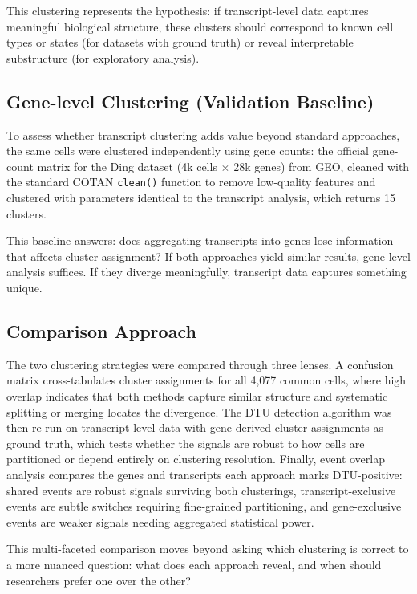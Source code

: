 This clustering represents the hypothesis: if transcript-level data captures meaningful biological structure, these clusters should correspond to known cell types or states (for datasets with ground truth) or reveal interpretable substructure (for exploratory analysis).

\subsection*{Gene-level Clustering (Validation Baseline)}

To assess whether transcript clustering adds value beyond standard approaches, the same cells were clustered independently using gene counts: the official gene-count matrix for the Ding dataset (4k cells $\times$ 28k genes) from GEO, cleaned with the standard COTAN \texttt{clean()} function to remove low-quality features and clustered with parameters identical to the transcript analysis, which returns 15 clusters.

This baseline answers: does aggregating transcripts into genes lose information that affects cluster assignment? If both approaches yield similar results, gene-level analysis suffices. If they diverge meaningfully, transcript data captures something unique.

\subsection*{Comparison Approach}

The two clustering strategies were compared through three lenses. A confusion matrix cross-tabulates cluster assignments for all 4,077 common cells, where high overlap indicates that both methods capture similar structure and systematic splitting or merging locates the divergence. The DTU detection algorithm was then re-run on transcript-level data with gene-derived cluster assignments as ground truth, which tests whether the signals are robust to how cells are partitioned or depend entirely on clustering resolution. Finally, event overlap analysis compares the genes and transcripts each approach marks DTU-positive: shared events are robust signals surviving both clusterings, transcript-exclusive events are subtle switches requiring fine-grained partitioning, and gene-exclusive events are weaker signals needing aggregated statistical power.

This multi-faceted comparison moves beyond asking which clustering is correct to a more nuanced question: what does each approach reveal, and when should researchers prefer one over the other?


